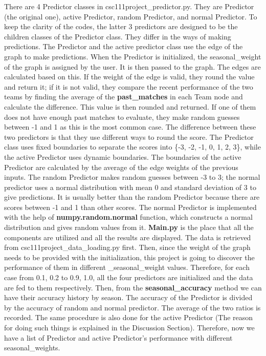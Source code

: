 \documentclass[fontsize=11pt]{article}
\begin{document}
There are 4 Predictor classes in csc111project\_predictor.py. They are Predictor (the original one), active Predictor, random Predictor, and normal Predictor. To keep the clarity of the codes, the latter 3 predictors are designed to be the children classes of the Predictor class. They differ in the ways of making predictions. The Predictor and the active predictor class use the edge of the graph to make predictions. When the Predictor is initialized, the seasonal\_weight of the graph is assigned by the user. It is then passed to the graph. The edges are calculated based on this. If the weight of the edge is valid, they round the value and return it; if it is not valid, they compare the recent performance of the two teams by finding the average of the \textbf{past\_matches} in each Team node and calculate the difference. This value is then rounded and returned. If one of them does not have enough past matches to evaluate, they make random guesses between -1 and 1 as this is the most common case. The difference between these two predictors is that they use different ways to round the score. The Predictor class uses fixed boundaries to separate the scores into \{-3, -2, -1, 0, 1, 2, 3\}, while the active Predictor uses dynamic boundaries. The boundaries of the active Predictor are calculated by the average of the edge weights of the previous inputs. The random Predictor makes random guesses between -3 to 3; the normal predictor uses a normal distribution with mean 0 and standard deviation of 3 to give predictions. It is usually better than the random Predictor because there are scores between -1 and 1 than other scores. The normal Predictor is implemented with the help of\textbf{ numpy.random.normal} function, which constructs a normal distribution and gives random values from it.
\newline
\newline
\textbf{Main.py} is the place that all the components are utilized and all the results are displayed. The data is retrieved from csc111project\_data\_loading.py first. Then, since the weight of the graph needs to be provided with the initialization, this project is going to discover the performance of them in different \_seasonal\_weight values. Therefore, for each case from 0.1, 0.2 to 0.9, 1.0, all the four predictors are initialized and the data are fed to them respectively. Then, from the \textbf{seasonal\_accuracy} method we can have their accuracy history by season. The accuracy of the Predictor is divided by the accuracy of random and normal predictor. The average of the two ratios is recorded. The same procedure is also done for the active Predictor (The reason for doing such things is explained in the Discussion Section). Therefore, now we have a list of Predictor and active Predictor's performance with different seasonal\_weights.
\end{document}
